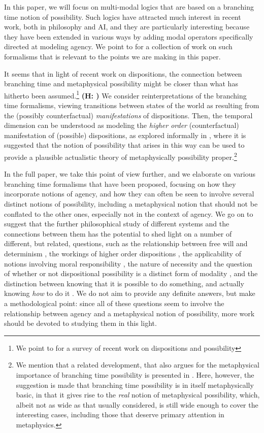 \documentclass{article}
\newcommand{\hannah}[1]{\textbf{\textcolor{OliveGreen}{(H: #1)}}}
\begin{document}
In this paper, we will focus on multi-modal logics that are based on a branching time notion of possibility. Such logics have attracted much interest in recent work, both in philosophy and AI, and they are particularly interesting because they have been extended in various ways by adding modal operators specifically directed at modeling agency. We point to \cite{stit,dstit,atl,atle,nctl,stitstart} for a collection of work on such formalisms that is relevant to the points we are making in this paper.

It seems that in light of recent work on dispositions, the connection between branching time and metaphysical possibility might be closer than what has hitherto been assumed.\footnote{We point to \cite{MwPw} for a survey of recent work on dispositions and possibility} \hannah{} We consider reinterpretations of the branching time formalisms, viewing transitions between states of the world as resulting from the (possibly counterfactual) \emph{manifestations} of dispositions. Then, the temporal dimension can be understood as modeling the \emph{higher order} (counterfactual) manifestation of (possible) dispositions, as explored informally in \cite{dispmod}, where it is suggested that the notion of possibility that arises in this way can be used to provide a plausible actualistic theory of metaphysically possibility proper.\footnote{We mention that a related development, that also argues for the metaphysical importance of branching time possibility is presented in \cite{realmod}. Here, however, the suggestion is made that branching time possibility is in itself metaphysically basic, in that it gives rise to the \emph{real} notion of metaphysical possibility, which, albeit not as wide as that usually considered, is still wide enough to cover the interesting cases, including those that deserve primary attention in metaphysics.}

In the full paper, we take this point of view further, and we elaborate on various branching time formalisms that have been proposed, focusing on how they incorporate notions of agency, and how they can often be seen to involve several distinct notions of possibility, including a metaphysical notion that should not be conflated to the other ones, especially not in the context of agency. We go on to suggest that the further philosophical study of different systems and the connections between them has the potential to shed light on a number of different, but related, questions, such as the relationship between free will and determinism \cite{Listfree,strawsonfree}, the workings of higher order dispositions \cite{dispmod}, the applicability of notions involving moral responsibility \cite{frankfurt,mensrea}, the nature of necessity and the question of whether or not dispositional possibility is a distinct form of modality \cite{DM,EaM,Los}, and the distinction between knowing that it is possible to do something, and actually knowing \emph{how} to do it \cite{atlhow,atlhowto}. We do not aim to provide any definite answers, but make a methodological point: since all of these questions seem to involve the relationship between agency and a metaphysical notion of possibility, more work should be devoted to studying them in this light.



\end{document}
